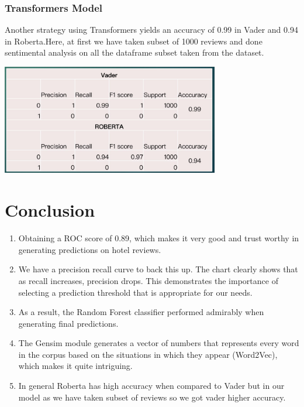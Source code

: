 \subsubsection{Transformers Model}
Another strategy using Transformers yields an accuracy of 0.99 in Vader and 0.94 in Roberta.Here, at first we have taken subset of 1000 reviews and done sentimental analysis on all the dataframe subset taken from the dataset.

\includegraphics[width=9.5cm, height=9cm \textwidth]{vader and roberta.jpeg}\\
\section{Conclusion}
\begin{enumerate}
    \item Obtaining a ROC score of 0.89, which makes it very good and trust worthy in generating predictions on hotel reviews.
    \item We have a precision recall curve to back this up. The chart clearly shows that as recall increases, precision drops. This demonstrates the importance of selecting a prediction threshold that is appropriate for our needs.
    \item As a result, the Random Forest classifier performed admirably when generating final predictions.
    \item The Gensim module generates a vector of numbers that represents every word in the corpus based on the situations in which they appear (Word2Vec), which makes it quite intriguing.
    \item In general Roberta has high accuracy when compared to Vader but in our model as we have taken subset of reviews so we got vader higher accuracy.
    
    
\end{enumerate}

